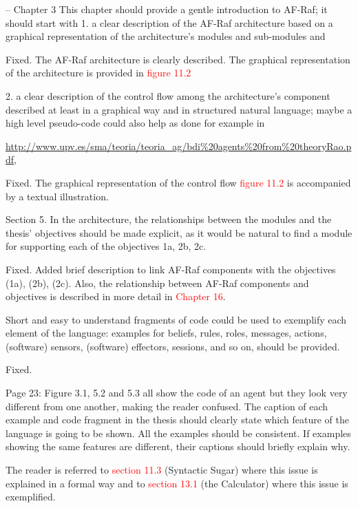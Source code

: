 \documentclass{article}
\newcommand*\R[1]{\textcolor{red}{#1}} %
\newenvironment{them}{\noindent\begingroup\color{blue}}{\endgroup\par}
\begin{document}
\begin{them}

-- Chapter 3
This chapter should provide a gentle introduction to AF-Raf; it should start
with 1. a clear description of the AF-Raf architecture based on a graphical
representation of the architecture's modules and sub-modules and

\end{them}
Fixed. The AF-Raf architecture is clearly described. The graphical
representation of the architecture is provided in \R{figure 11.2}

\begin{them}

2. a clear description of the control flow among the architecture's component
described at least in a graphical way and in structured natural language; maybe
a high level pseudo-code could also help as done for example in

\url{http://www.upv.es/sma/teoria/teoria_ag/bdi\%20agents\%20from\%20theoryRao.pdf},
\end{them}
Fixed. The graphical representation of the control flow \R{figure 11.2} is
accompanied by a textual illustration.

\begin{them}

Section 5.
In the architecture, the relationships between the modules and the thesis'
objectives should be made explicit, as it would be natural to find a module for
supporting each of the objectives 1a, 2b, 2c.

\end{them}
Fixed. Added brief description to link AF-Raf components with the objectives
(1a), (2b), (2c). Also, the relationship between AF-Raf components and
objectives is described in  more detail in \R{Chapter 16}.

\begin{them}

Short and easy to understand fragments of code could be used to exemplify each
element of the language: examples for beliefs, rules, roles, messages, actions,
(software) sensors, (software) effectors, sessions, and so on, should be
provided.

\end{them}
Fixed. 

\begin{them}

Page 23:
Figure 3.1, 5.2 and 5.3 all show the code of an agent but they look very
different from one another, making the reader confused. The caption of each
example and code fragment in the thesis should clearly state which feature of
the language is going to be shown. All the examples should be consistent. If
examples showing the same features are different, their captions should briefly
explain why.

\end{them}
The reader is referred to \R{section 11.3} (Syntactic Sugar) where this issue
is explained in a formal way and to \R{section 13.1} (the Calculator) where
this issue is exemplified.
\end{document}
